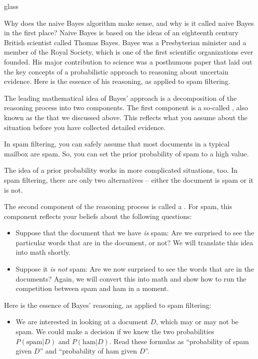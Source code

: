 \begin{tblsfilledsymbol}{}{glass}
\begin{underthehood}

Why does the naive Bayes algorithm make sense, and why is it called
naive Bayes in the first place? Naive Bayes is based on
the ideas of an eighteenth century British scientist called Thomas
Bayes. Bayes was a Presbyterian minister and a member of the
Royal Society, which is one of the first scientific organizations ever
founded.  His major contribution to science was a posthumous paper
that laid out the key concepts of a probabilistic approach to
reasoning about uncertain evidence.  Here is the essence of his
reasoning, as applied to spam filtering.

The leading mathematical idea of Bayes' approach is a decomposition of
the reasoning process into two components. The first component is a
so-called , also known as the  that we discussed above.  This reflects
what you assume about the situation before you have collected detailed
evidence.

In spam filtering, you can safely assume that most documents in a
typical mailbox are spam. So, you can set the prior probability of
spam to a high value.

The idea of a prior probability works in more complicated situations,
too. In spam filtering, there are only two alternatives -- either the
document is spam or it is not. 

The second component of the reasoning process is called a
.  For spam, this component reflects your
beliefs about the following questions:

\begin{itemize}
\item Suppose that the document that we have \emph{is} spam: Are
  we surprised to see the particular words that are in the document,
  or not? We will translate this idea into math shortly.
	      
\item Suppose it \emph{is not} spam: Are we now surprised to see
  the words that are in the documents?  Again, we will convert this
  into math and show how to run the competition between spam and
  ham in a moment.
\end{itemize}


Here is the essence of Bayes' reasoning, as applied to spam filtering:
\begin{itemize}
	\item We are interested in looking at a document \(D\), which may or may not be spam. 
	We could make a decision if we knew the two probabilities \(P(\mbox{spam}|D)\) and \(P(\mbox{ham}|D)\). 
	Read these formulas as ``probability of spam given \(D\)'' and 
	``probability of ham given \(D\)''. 


\end{itemize}
\end{underthehood}
\end{tblsfilledsymbol}
